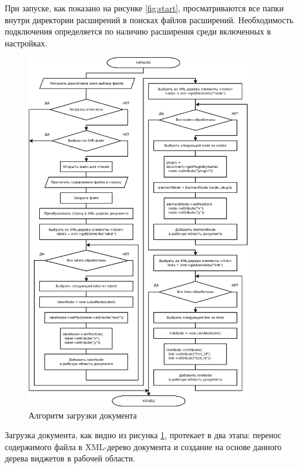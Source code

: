 При запуске, как показано на рисунке \ref{fig:start}, просматриваются все папки внутри директории расширений в поисках файлов расширений.
Необходимость подключения определяется по наличию расширения среди включенных в настройках.

\begin{figure}[H]
  \centering
  \includegraphics[width=0.87\textwidth]{diagrams/block-schemes/load.png}
  \caption{Алгоритм загрузки документа}
  \label{fig:load-file}
\end{figure}

Загрузка документа, как видно из рисунка \ref{fig:load-file}, протекает в два этапа: перенос содержимого файла в XML-дерево документа и создание на основе данного дерева виджетов в рабочей области.

